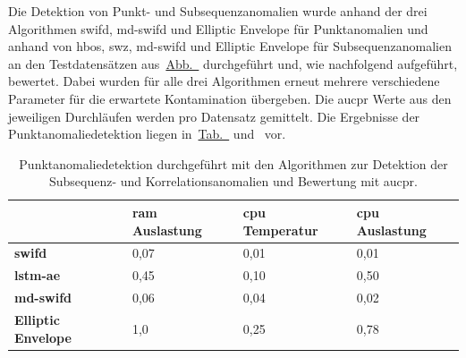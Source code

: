 Die Detektion von Punkt- und Subsequenzanomalien wurde anhand der drei Algorithmen \ac{swifd}, \ac{md-swifd} und Elliptic Envelope für Punktanomalien und anhand von \ac{hbos}, \ac{swz},
\ac{md-swifd} und Elliptic Envelope für Subsequenzanomalien an den Testdatensätzen aus~\hyperref[fig:punktanomalien_testdata]{Abb.~}
durchgeführt und, wie nachfolgend aufgeführt, bewertet. Dabei wurden für alle drei Algorithmen erneut mehrere verschiedene Parameter für die erwartete Kontamination
übergeben. Die \ac{aucpr} Werte aus den jeweiligen Durchläufen werden pro Datensatz gemittelt. Die Ergebnisse der Punktanomaliedetektion liegen
in~\hyperref[tab:punktanomaliedetektion_kreuzweise]{Tab.~} und~ vor.

\begin{table}[H]
    \centering
    \renewcommand{\arraystretch}{1.5} %
    \begin{tabular}{l|lll}
                                & \textbf{\ac{ram} Auslastung}  & \textbf{\ac{cpu} Temperatur}  & \textbf{\ac{cpu} Auslastung} \\
    \hline
    \textbf{\ac{swifd}}         & \cellcolor{red!20}0,07        & \cellcolor{red!35}0,01        & \cellcolor{red!35}0,01 \\
    \textbf{\ac{lstm-ae}}       & \cellcolor{green!7}0,45       & \cellcolor{red!22}0,10        & \cellcolor{green!10}0,50 \\
    \textbf{\ac{md-swifd}}      & \cellcolor{red!20}0,06        & \cellcolor{red!20}0,04        & \cellcolor{red!30}0,02 \\
    \textbf{Elliptic Envelope}  & \cellcolor{green!40}1,0       & \cellcolor{red!5}0,25         & \cellcolor{green!25}0,78 
    \end{tabular}
    \caption{\centering Punktanomaliedetektion durchgeführt mit den Algorithmen zur Detektion der Subsequenz- und Korrelationsanomalien und Bewertung mit \acs*{aucpr}.}
    \label{tab:punktanomaliedetektion_kreuzweise}
\end{table}

